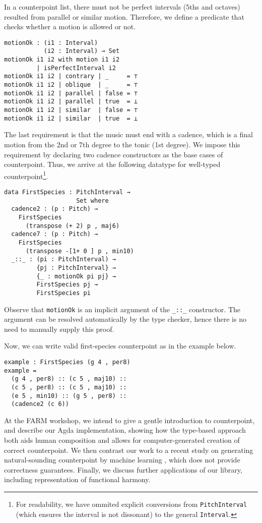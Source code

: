 \documentclass[sigplan,review]{acmart}\settopmatter{printfolios=true,printccs=false,printacmref=false}
\begin{document}
In a counterpoint list, there must not be perfect intervals 
(5ths and octaves) resulted from parallel or similar motion.
Therefore, we define a predicate that checks whether a motion 
is allowed or not.

\begin{lstlisting}
motionOk : (i1 : Interval)
           (i2 : Interval) → Set
motionOk i1 i2 with motion i1 i2
         | isPerfectInterval i2
motionOk i1 i2 | contrary | _     = ⊤
motionOk i1 i2 | oblique  | _     = ⊤
motionOk i1 i2 | parallel | false = ⊤
motionOk i1 i2 | parallel | true  = ⊥
motionOk i1 i2 | similar  | false = ⊤
motionOk i1 i2 | similar  | true  = ⊥
\end{lstlisting}

The last requirement is that the music must end with a cadence,
 which is a final motion from the 2nd or 7th degree to the tonic 
(1st degree). 
We impose this requirement by declaring two cadence constructors 
as the base cases of counterpoint.
Thus, we arrive at the following datatype for well-typed counterpoint\footnote{
For readability, we have ommited explicit conversions 
from \texttt{PitchInterval} (which ensures the interval is not dissonant) 
to the general \texttt{Interval}.}.

\begin{lstlisting}
data FirstSpecies : PitchInterval →
                    Set where
  cadence2 : (p : Pitch) →
    FirstSpecies
      (transpose (+ 2) p , maj6)
  cadence7 : (p : Pitch) →
    FirstSpecies
      (transpose -[1+ 0 ] p , min10)
  _::_ : (pi : PitchInterval) →
         {pj : PitchInterval} →
         {_ : motionOk pi pj} →
         FirstSpecies pj →
         FirstSpecies pi
\end{lstlisting}

\noindent Observe that \texttt{motionOk} is an implicit argument of 
the \texttt{\_::\_} constructor. 
The argument can be resolved automatically by the type checker,
hence there is no need to manually supply this proof. 

Now, we can write valid first-species counterpoint as in the 
example below.

\begin{lstlisting}
example : FirstSpecies (g 4 , per8)
example = 
  (g 4 , per8) :: (c 5 , maj10) ::
  (c 5 , per8) :: (c 5 , maj10) ::
  (e 5 , min10) :: (g 5 , per8) ::
  (cadence2 (c 6))
\end{lstlisting}

At the FARM workshop, we intend to give a gentle introduction to
counterpoint, and describe our Agda implementation, showing how the
type-based approach both aids human composition and allows for 
computer-generated creation of correct counterpoint.
We then contrast our work to a recent study on generating
natural-sounding counterpoint by machine learning
\citep{CounterpointByConvolution}, which does not provide correctness
guarantees.
Finally, we discuss further applications of our library, including
representation of functional harmony.
\end{document}
